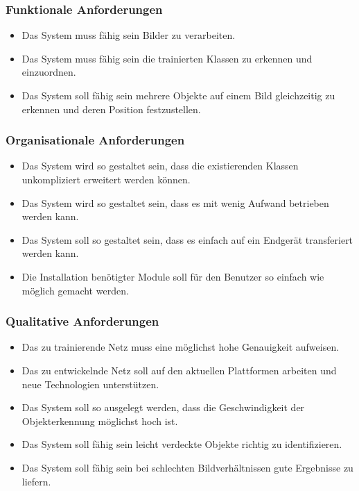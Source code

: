 \documentclass[a4paper,12pt,oneside]{article}
\begin{document}
\subsubsection{Funktionale Anforderungen}
  \begin{itemize}
\item Das System muss fähig sein Bilder zu verarbeiten. 
\item Das System muss fähig sein die trainierten Klassen zu erkennen und einzuordnen.
\item Das System soll fähig sein mehrere Objekte auf einem Bild gleichzeitig zu erkennen und deren Position festzustellen.
  \end{itemize}  
	
\subsubsection{Organisationale Anforderungen}
 \begin{itemize}
\item Das System wird so gestaltet sein, dass die existierenden Klassen unkompliziert erweitert werden können.
\item Das System wird so gestaltet sein, dass es mit wenig Aufwand betrieben werden kann.
\item Das System soll so gestaltet sein, dass es einfach auf ein Endgerät transferiert werden kann.
\item Die Installation benötigter Module soll für den Benutzer so einfach wie möglich gemacht werden.
  \end{itemize}
  
\subsubsection{Qualitative Anforderungen}
 \begin{itemize}
\item Das zu trainierende Netz muss eine möglichst hohe Genauigkeit aufweisen. 
\item Das zu entwickelnde Netz soll auf den aktuellen Plattformen arbeiten und neue Technologien unterstützen.
\item Das System soll so ausgelegt werden, dass die Geschwindigkeit der Objekterkennung möglichst hoch ist.
\item Das System soll fähig sein leicht verdeckte Objekte richtig zu identifizieren.
\item Das System soll fähig sein bei schlechten Bildverhältnissen gute Ergebnisse zu liefern.
  \end{itemize}  
  
\end{document}
